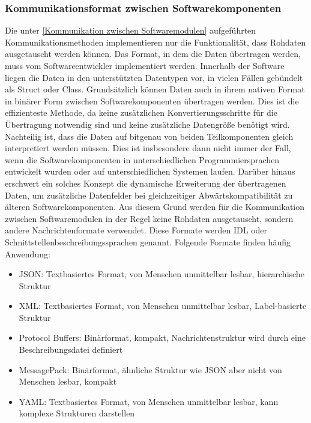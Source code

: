 \subsubsection{Kommunikationsformat zwischen Softwarekomponenten}

Die unter \autoref{Kommunikation zwischen Softwaremodulen} aufgeführten Kommunikationsmethoden implementieren nur die Funktionalität, dass Rohdaten ausgetauscht werden können. Das Format, in dem die Daten übertragen werden, muss vom Softwareentwickler implementiert werden. Innerhalb der Software liegen die Daten in den unterstützten Datentypen vor, in vielen Fällen gebündelt als Struct oder Class. Grundsätzlich können Daten auch in ihrem nativen Format in binärer Form zwischen Softwarekomponenten übertragen werden. Dies ist die effizienteste Methode, da keine zusätzlichen Konvertierungsschritte für die Übertragung notwendig sind und keine zusätzliche Datengröße benötigt wird. Nachteilig ist, dass die Daten auf bitgenau von beiden Teilkomponenten gleich interpretiert werden müssen. Dies ist insbesondere dann nicht immer der Fall, wenn die Softwarekomponenten in unterschiedlichen Programmiersprachen entwickelt wurden oder auf unterschiedlichen Systemen laufen. Darüber hinaus erschwert ein solches Konzept die dynamische Erweiterung der übertragenen Daten, um zusätzliche Datenfelder bei gleichzeitiger Abwärtskompatibilität zu älteren Softwarekomponenten. Aus diesem Grund werden für die Kommunikation zwischen Softwaremodulen in der Regel keine Rohdaten ausgetauscht, sondern andere Nachrichtenformate verwendet. Diese Formate werden \gls{IDL} oder Schnittstellenbeschreibungssprachen genannt. Folgende Formate finden häufig Anwendung:

\begin{itemize}
    \item \gls{JSON}: Textbasiertes Format, von Menschen unmittelbar lesbar, hierarchische Struktur
    \item \gls{XML}: Textbasiertes Format, von Menschen unmittelbar lesbar, Label-basierte Struktur
    \item Protocol Buffers: Binärformat, kompakt, Nachrichtenstruktur wird durch eine Beschreibungsdatei definiert
    \item MessagePack: Binärformat, ähnliche Struktur wie \gls{JSON} aber nicht von Menschen lesbar, kompakt
    \item \gls{YAML}: Textbasiertes Format, von Menschen unmittelbar lesbar, kann komplexe Strukturen darstellen
\end{itemize}

